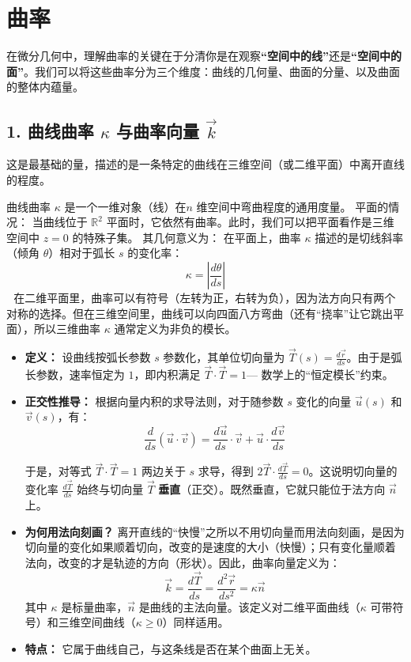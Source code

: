 \chapter{曲率}
在微分几何中，理解曲率的关键在于分清你是在观察\textbf{“空间中的线”}还是\textbf{“空间中的面”}。我们可以将这些曲率分为三个维度：曲线的几何量、曲面的分量、以及曲面的整体内蕴量。
\section{1. 曲线曲率 $\kappa$ 与曲率向量 $\vec{k}$}
这是最基础的量，描述的是一条特定的曲线在三维空间（或二维平面）中离开直线的程度。

曲线曲率 $\kappa$ 是一个一维对象（线）在$n$ 维空间中弯曲程度的通用度量。
平面的情况： 当曲线位于 $\mathbb{R}^2$ 平面时，它依然有曲率。此时，我们可以把平面看作是三维空间中 $z=0$ 的特殊子集。
其几何意义为： 在平面上，曲率 $\kappa$ 描述的是切线斜率（倾角 $\theta$）相对于弧长 $s$ 的变化率： $$\kappa = \left| \frac{d\theta}{ds} \right|$$ 
在二维平面里，曲率可以有符号（左转为正，右转为负），因为法方向只有两个对称的选择。但在三维空间里，曲线可以向四面八方弯曲（还有“挠率”让它跳出平面），所以三维曲率 $\kappa$ 通常定义为非负的模长。

\begin{itemize}
\item \textbf{定义：} 设曲线按弧长参数 $s$ 参数化，其单位切向量为 $\vec{T}(s) = \frac{d\vec{r}}{ds}$。由于是弧长参数，速率恒定为 $1$，即内积满足 $\vec{T} \cdot \vec{T} = 1$--- 数学上的“恒定模长”约束。
\item \textbf{正交性推导：} 
根据向量内积的求导法则，对于随参数 $s$ 变化的向量 $\vec{u}(s)$ 和 $\vec{v}(s)$，有：$$ \frac{d}{ds}(\vec{u} \cdot \vec{v}) = \frac{d\vec{u}}{ds} \cdot \vec{v} + \vec{u} \cdot \frac{d\vec{v}}{ds} $$

于是，对等式 $\vec{T} \cdot \vec{T} = 1$ 两边关于 $s$ 求导，得到 $2 \vec{T} \cdot \frac{d\vec{T}}{ds} = 0$。这说明切向量的变化率 $\frac{d\vec{T}}{ds}$ 始终与切向量 $\vec{T}$ \textbf{垂直}（正交）。既然垂直，它就只能位于法方向 $\vec{n}$ 上。

\item \textbf{为何用法向刻画？} 离开直线的“快慢”之所以不用切向量而用法向刻画，是因为切向量的变化如果顺着切向，改变的是速度的大小（快慢）；只有变化量顺着法向，改变的才是轨迹的方向（形状）。因此，曲率向量定义为：
\[ \vec{k} = \frac{d\vec{T}}{ds} = \frac{d^2\vec{r}}{ds^2} = \kappa \vec{n} \]
其中 $\kappa$ 是标量曲率，$\vec{n}$ 是曲线的主法向量。该定义对二维平面曲线（$\kappa$ 可带符号）和三维空间曲线（$\kappa \geq 0$）同样适用。

\item \textbf{特点：} 它属于曲线自己，与这条线是否在某个曲面上无关。
\end{itemize}
